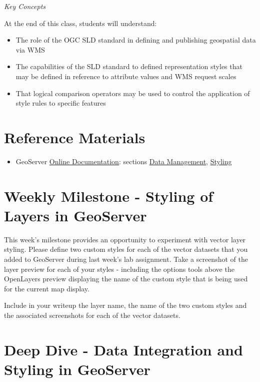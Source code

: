 \documentclass[]{book}
\providecommand{\tightlist}{%
  \setlength{\itemsep}{0pt}\setlength{\parskip}{0pt}}
\begin{document}
\emph{Key Concepts}

At the end of this class, students will understand:

\begin{itemize}
\tightlist
\item
  The role of the OGC SLD standard in defining and publishing geospatial
  data via WMS
\item
  The capabilities of the SLD standard to defined representation styles
  that may be defined in reference to attribute values and WMS request
  scales
\item
  That logical comparison operators may be used to control the
  application of style rules to specific features
\end{itemize}

\section{Reference Materials}\label{week14-reference}

\begin{itemize}
\tightlist
\item
  GeoServer
  \href{http://docs.geoserver.org/stable/en/user/index.html}{Online
  Documentation}: sections
  \href{http://docs.geoserver.org/latest/en/user/data/index.html\#data}{Data
  Management},
  \href{http://docs.geoserver.org/latest/en/user/styling/index.html\#styling}{Styling}
\end{itemize}

\section{Weekly Milestone - Styling of Layers in
GeoServer}\label{weekly-milestone---styling-of-layers-in-geoserver}

This week's milestone provides an opportunity to experiment with vector
layer styling. Please define two custom styles for each of the vector
datasets that you added to GeoServer during last week's lab assignment.
Take a screenshot of the layer preview for each of your styles -
including the options tools above the OpenLayers preview displaying the
name of the custom style that is being used for the current map display.

Include in your writeup the layer name, the name of the two custom
styles and the associated screenshots for each of the vector datasets.

\section{Deep Dive - Data Integration and Styling in
GeoServer}\label{deep-dive---data-integration-and-styling-in-geoserver}
\end{document}
